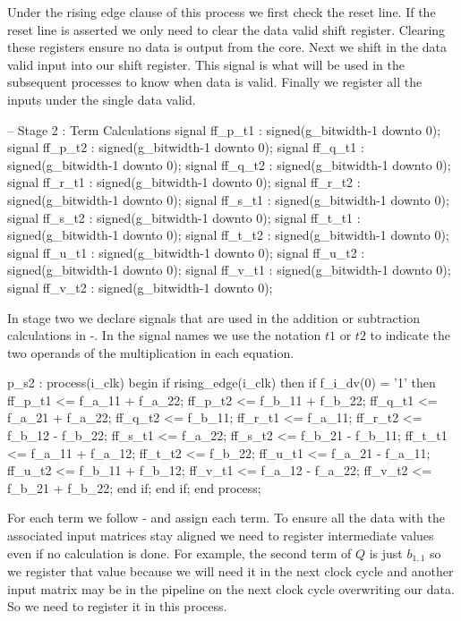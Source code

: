 Under the rising edge clause of this process we first check the reset line. If the reset line is asserted we only need to clear the data valid shift register. Clearing these registers ensure no data is output from the core. Next we shift in the data valid input into our shift register. This signal is what will be used in the subsequent processes to know when data is valid. Finally we register all the inputs under the single data valid. 

\begin{VHDLlisting}[tabsize=2]
-- Stage 2 : Term Calculations
signal ff_p_t1 : signed(g_bitwidth-1 downto 0);
signal ff_p_t2 : signed(g_bitwidth-1 downto 0);
signal ff_q_t1 : signed(g_bitwidth-1 downto 0);
signal ff_q_t2 : signed(g_bitwidth-1 downto 0);
signal ff_r_t1 : signed(g_bitwidth-1 downto 0);
signal ff_r_t2 : signed(g_bitwidth-1 downto 0);
signal ff_s_t1 : signed(g_bitwidth-1 downto 0);
signal ff_s_t2 : signed(g_bitwidth-1 downto 0);
signal ff_t_t1 : signed(g_bitwidth-1 downto 0);
signal ff_t_t2 : signed(g_bitwidth-1 downto 0);
signal ff_u_t1 : signed(g_bitwidth-1 downto 0);
signal ff_u_t2 : signed(g_bitwidth-1 downto 0);
signal ff_v_t1 : signed(g_bitwidth-1 downto 0);
signal ff_v_t2 : signed(g_bitwidth-1 downto 0);
\end{VHDLlisting} 

In stage two we declare signals that are used in the addition or subtraction calculations in -. In the signal names we use the notation $t1$ or $t2$ to indicate the two operands of the multiplication in each equation. 

\begin{VHDLlisting}[tabsize=2]
p_s2 : process(i_clk)
	begin
		if rising_edge(i_clk) then
			if f_i_dv(0) = '1' then
				ff_p_t1 <= f_a_11 + f_a_22;
				ff_p_t2 <= f_b_11 + f_b_22;
				ff_q_t1 <= f_a_21 + f_a_22;
				ff_q_t2 <= f_b_11;
				ff_r_t1 <= f_a_11;
				ff_r_t2 <= f_b_12 - f_b_22;
				ff_s_t1 <= f_a_22;
				ff_s_t2 <= f_b_21 - f_b_11;
				ff_t_t1 <= f_a_11 + f_a_12;
				ff_t_t2 <= f_b_22;
				ff_u_t1 <= f_a_21 - f_a_11;
				ff_u_t2 <= f_b_11 + f_b_12;
				ff_v_t1 <= f_a_12 - f_a_22;
				ff_v_t2	<= f_b_21 + f_b_22;
			end if;
		end if;
	end process;
\end{VHDLlisting}

For each term we follow - and assign each term. To ensure all the data with the associated input matrices stay aligned we need to register intermediate values even if no calculation is done. For example, the second term of $Q$ is just $b_{1,1}$ so we register that value because we will need it in the next clock cycle and another input matrix may be in the pipeline on the next clock cycle overwriting our data. So we need to register it in this process.

